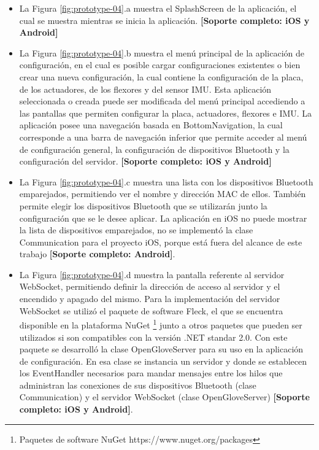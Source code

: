 \begin{itemize}

\item La Figura \ref{fig:prototype-04}.a muestra el SplashScreen de la aplicación, el cual se muestra mientras se inicia la aplicación. \textbf{[Soporte completo: iOS y Android]}

\item La Figura \ref{fig:prototype-04}.b muestra el menú principal de la aplicación de configuración, en el cual es posible cargar configuraciones existentes o bien crear una nueva configuración, la cual contiene la configuración de la placa, de los actuadores, de los flexores y del sensor IMU. Esta aplicación seleccionada o creada puede ser modificada del menú principal accediendo a las pantallas que permiten configurar la placa, actuadores, flexores e IMU. La aplicación posee una navegación basada en BottomNavigation, la cual corresponde a una	 barra de navegación inferior que permite acceder al menú de configuración general, la configuración de dispositivos Bluetooth y la configuración del servidor. \textbf{[Soporte completo: iOS y Android]}

\item La Figura \ref{fig:prototype-04}.c muestra una lista con los dispositivos Bluetooth emparejados, permitiendo ver el nombre y dirección MAC de ellos. También permite elegir los dispositivos Bluetooth que se utilizarán junto la configuración que se le desee aplicar. La aplicación en iOS no puede mostrar la lista de dispositivos emparejados, no se implementó la clase Communication para el proyecto iOS, porque está fuera del alcance de este trabajo \textbf{[Soporte completo: Android]}.

\item La Figura \ref{fig:prototype-04}.d muestra la pantalla referente al servidor WebSocket, permitiendo definir la dirección de acceso al servidor y el encendido y apagado del mismo. Para la implementación del servidor WebSocket se utilizó el paquete de software Fleck, el que se encuentra disponible en la plataforma NuGet \footnote{Paquetes de software NuGet https://www.nuget.org/packages} junto a otros paquetes que pueden ser utilizados si son compatibles con la versión .NET standar 2.0. Con este paquete se desarrolló la clase OpenGloveServer para su uso en la aplicación de configuración. En esa clase se instancia un servidor y  donde se establecen los EventHandler necesarios para mandar mensajes entre los hilos que administran las conexiones de sus dispositivos Bluetooth (clase Communication) y el servidor WebSocket (clase OpenGloveServer) \textbf{[Soporte completo: iOS y Android]}.


\end{itemize}
